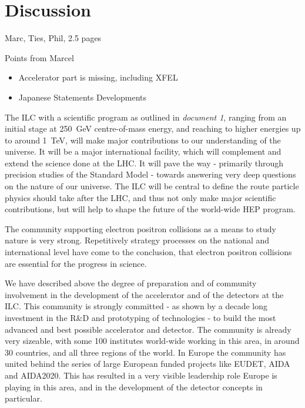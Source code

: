 \documentclass[%
 reprint,
 amsmath,amssymb,
 aps,
]{revtex4-1}
\begin{document}
\section{\label{sec:discussion}Discussion}

Marc, Ties, Phil, 2.5 pages

Points from Marcel
\begin{itemize}
    \item Accelerator part is missing, including XFEL
    \item Japanese Statements Developments
\end{itemize}




The ILC with a scientific program as outlined in {\it document 1}, ranging from 
an initial stage at 250~GeV centre-of-mass energy, and reaching to higher 
energies up to around 1~TeV, will make major contributions to our understanding 
of the universe. It will be a major international facility, which will 
complement and extend the science done at the LHC. It will pave the way - 
primarily through precision studies of the Standard Model - towards answering 
very deep questions on the nature of our universe. The ILC will be central to 
define the route particle physics should take after the LHC, and thus not only 
make major scientific contributions, but will help to shape the future of the 
world-wide HEP program. 

The community supporting electron positron collisions as a means to study nature 
is very strong. Repetitively strategy processes on the national and 
international level have come to the conclusion, that electron positron 
collisions are essential for the progress in science. 

We have described above the degree of preparation and of community involvement 
in the development of the accelerator and of the detectors at the ILC. This 
community is strongly committed - as shown by a decade long investment in the 
R\&D and prototyping of technologies - to build the most advanced and best 
possible accelerator and detector. The community is already very sizeable, with 
some 100 institutes world-wide working in this area, in around 30 countries, and 
all three regions of the world. In Europe the community has united behind the 
series of large European funded projects like EUDET, AIDA and AIDA2020. This has 
resulted in a very visible leadership role Europe is playing in this area, and 
in the development of the detector concepts in particular. 
\end{document}
